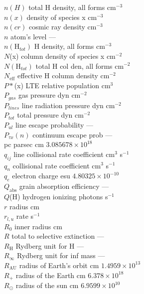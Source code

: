 \begin{tabbing}
$n(H)$ \>  total
H density, all forms \>  cm$^{-3}$\\
$n(x)$ \>  density of species x \>  cm$^{-3}$\\
$n(cr)$ \>  cosmic ray
density \>  cm$^{-3}$\\
$n$ \>  atom's level \> --- \\
$n(\mathrm{H}_{tot})$ \>  H density, all forms \>  cm$^{-3}$\\
$N$(x) \>  column density
of species x \>  cm$^{-2}$\\
$N(\mathrm{H}_{tot})$ \>  total H col den, all forms \>   cm$^{-2}$\\
$N_{\mathrm{eff}}$ \>  effective H
column density \>  cm$^{-2}$\\
$ P*$(x) \>  LTE relative population \>  cm$^3$\\
$P_{gas}$ \>  gas pressure \>  dyn
cm$^{-2}$\\
$P_{lines}$ \>  line radiation pressure \> dyn cm$^{-2}$\\
$P_{tot}$ \>  total pressure \>  dyn cm$^{-2}$\\
$P_{ul}$ \>  line
escape probability \> ---\\
$P_{\tau x}(n)$ \>  continuum escape prob \> ---\\
pc \>  parsec \>  cm \>  $3.085678\times 10^{18}$\\
$q_{ij}$ \>  line collisional rate coefficient \>  cm$^3$ s$^{-1}$\\
$q_n$ \>
collisional rate coefficient \>  cm$^3$ s$^{-1}$\\
$q_e$ \>  electron charge \>   esu \>
$4.80325\times 10^{-10}$\\
$Q_{\mathrm{abs}}$ \>  grain absorption efficiency \> ---\\
$Q$(H) \>  hydrogen ionizing photons \>
s$^{-1}$\\
$r$ \>  radius \>  cm\\
$r_{l,u}$ \>  rate \>  s$^{-1}$\\
$R_0$ \>  inner radius \>  cm\\
$R$ \>  total to selective extinction \> ---\\
$R_{\mathrm{H}}$ \>  Rydberg unit for H \> ---\\
$R_\infty$ \>  Rydberg unit for inf mass \> ---\\
$R_{\mathrm{AU}}$ \>  radius of Earth's orbit \>  cm \>  $1.4959\times 10^{13}$\\
$R_+$ \>  radius of the
Earth \>  cm \>  $6.378\times10^{18}$\\
$R_\odot$ \>  radius of the sun \>  cm \>  $6.9599\times 10^{10}$\\

\end{tabbing}
